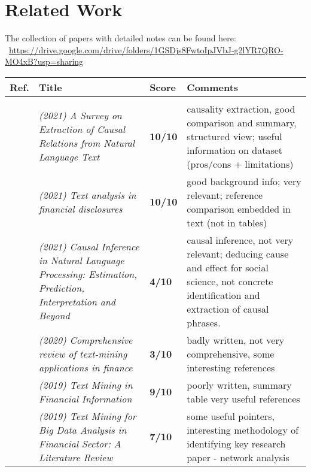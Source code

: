 \documentclass[10pt]{article}
\begin{document}
\section{Related Work}

The collection of papers with detailed notes can be found here: \\
~\url {https://drive.google.com/drive/folders/1GSDjs8FwtoIpJVbJ-g2lYR7QRO-MO4xB?usp=sharing}


\begin{landscape}
\begin{longtable}{ |m{2em}|m{28em}|m{3em}|m{24em}| } 
 \hline
Ref. & Title & Score & Comments \\ 
 \hline
 
\rowcolor{lightgray}\multicolumn{4}{|l|}{Surveys} \\
 \hline 
 
~\cite{2021_survey_extraction_causality} & \emph{(2021) A Survey on Extraction of Causal Relations from Natural Language Text} & \textbf{10/10} & causality extraction, good comparison and summary, structured view; useful information on dataset (pros/cons + limitations) \\
 \hline
~\cite{2021_survey_textanalysis_fin} & \emph{(2021) Text analysis in financial disclosures} & \textbf{10/10} & good background info; very relevant; reference comparison embedded in text (not in tables)\\
 \hline
~\cite{2021_survey_causalInfer} &\emph{(2021) Causal Inference in Natural Language Processing: Estimation, Prediction, Interpretation and Beyond}&
\textbf{4/10} & causal inference, not very relevant; deducing cause and effect for social science, not concrete identification and extraction of causal phrases.\\
 \hline

~\cite{2020_survey_textmining_finance} &\emph{(2020) Comprehensive review of text-mining applications in finance}
& \textbf{3/10} & badly written, not very comprehensive, some interesting references\\
 \hline

~\cite{2019_survey_textmining_fin} &\emph{(2019) Text Mining in Financial Information}
& \textbf{9/10} & poorly written, summary table very useful references \\
 \hline

~\cite{2019_survey_textmining_financialsector} & \emph{(2019) Text Mining for Big Data Analysis in Financial Sector: A Literature Review} 
& \textbf{7/10} & some useful pointers, interesting methodology of identifying key research paper - network analysis\\
 \hline


\end{longtable}
\end{landscape}
\end{document}
